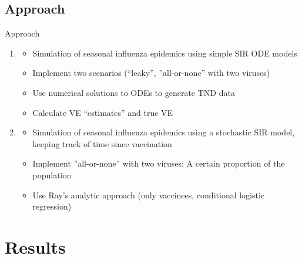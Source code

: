 \documentclass{beamer}
\begin{document}
\subsection{Approach}
\begin{frame}{Approach}
%
\begin{enumerate}
	\item 	\begin{itemize}
		\item<2-> Simulation of seasonal influenza epidemics using simple SIR ODE models
		\item<3-> Implement two scenarios (``leaky'', ''all-or-none'' with two viruses)
		\item<4-> Use numerical solutions to ODEs to generate TND data
		\item<5-> Calculate VE ``estimates'' and true VE
	\end{itemize}
	\item<6-> 	\begin{itemize}
	\item Simulation of seasonal influenza epidemics using a stochastic SIR model, keeping track of time since vaccination
	\item Implement ''all-or-none'' with two viruses: A certain proportion of the population 
	\item Use Ray's analytic approach (only vaccinees, conditional logistic regression)
\end{itemize}
\end{enumerate}
\end{frame}
%
\section{Results}
\end{document}
